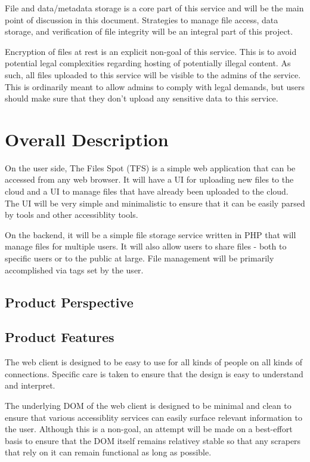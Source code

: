 \documentclass[12pt,a4paper]{report}
\begin{document}
File and data/metadata storage is a core part of this service and will be the main point of discussion in this document. Strategies to manage file access, data storage, and verification of file integrity will be an integral part of this project.

Encryption of files at rest is an explicit non-goal of this service. This is to avoid potential legal complexities regarding hosting of potentially illegal content. As such, all files uploaded to this service will be visible to the admins of the service. This is ordinarily meant to allow admins to comply with legal demands, but users should make sure that they don't upload any sensitive data to this service.

\section{Overall Description} \label{sec:overall_description}
On the user side, The Files Spot (TFS) is a simple web application that can be accessed from any web browser. It will have a UI for uploading new files to the cloud and a UI to manage files that have already been uploaded to the cloud. The UI will be very simple and minimalistic to ensure that it can be easily parsed by tools and other accessiblity tools.

On the backend, it will be a simple file storage service written in PHP that will manage files for multiple users. It will also allow users to share files - both to specific users or to the public at large. File management will be primarily accomplished via tags set by the user.

\subsection{Product Perspective}
\subsection{Product Features}
The web client is designed to be easy to use for all kinds of people on all kinds of connections. Specific care is taken to ensure that the design is easy to understand and interpret.

The underlying DOM of the web client is designed to be minimal and clean to ensure that various accessiblity services can easily surface relevant information to the user. Although this is a non-goal, an attempt will be made on a best-effort basis to ensure that the DOM itself remains relativey stable so that any scrapers that rely on it can remain functional as long as possible.
\end{document}
